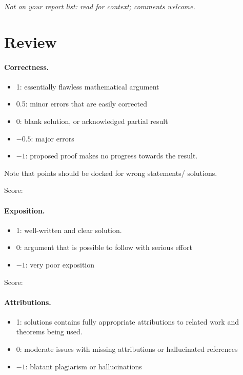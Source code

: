 \documentclass[11pt]{article}
\theoremstyle{remark}
\begin{document}
\maketitle
\noindent\textit{Not on your report list: read for context; comments welcome.}

\section{Review}

\paragraph{Correctness.}
\begin{itemize}
	\item  1: essentially flawless mathematical argument
	\item  0.5: minor errors that are easily corrected
	\item  0: blank solution, or acknowledged partial result
	\item  $-0.5$: major errors
	\item  $-1$: proposed proof makes no progress towards the result.
\end{itemize}
Note that points should be docked for wrong statements/ solutions.

\noindent Score: 

\paragraph{Exposition.}
\begin{itemize}
	\item  1: well-written and clear solution.
	\item  0: argument that is possible to follow with serious effort
	\item  $-1$: very poor exposition
\end{itemize}

\noindent Score: 

\paragraph{Attributions.}
\begin{itemize}
	\item  1: solutions contains fully appropriate attributions
		to related work and theorems being used.
	\item  0: moderate issues with missing attributions or hallucinated references
	\item  $-1$: blatant plagiarism or hallucinations
\end{itemize}
\end{document}
